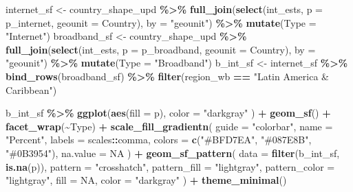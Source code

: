 \documentclass[
]{krantz}
\makeatletter
\newenvironment{Shaded}{\begin{snugshade}}{\end{snugshade}}
\newcommand{\AttributeTok}[1]{\textcolor[rgb]{0.27,0.27,0.27}{#1}}
\newcommand{\ConstantTok}[1]{\textcolor[rgb]{0.37,0.37,0.37}{#1}}
\newcommand{\FunctionTok}[1]{\textcolor[rgb]{0.27,0.27,0.27}{\textbf{#1}}}
\newcommand{\NormalTok}[1]{#1}
\newcommand{\OtherTok}[1]{\textcolor[rgb]{0.37,0.37,0.37}{#1}}
\newcommand{\SpecialCharTok}[1]{\textcolor[rgb]{0.43,0.43,0.43}{\textbf{#1}}}
\newcommand{\StringTok}[1]{\textcolor[rgb]{0.5,0.5,0.5}{#1}}
\newenvironment{kframe}{%
\medskip{}
\setlength{\fboxsep}{.8em}
 \def\at@end@of@kframe{}%
 \ifinner\ifhmode%
  \def\at@end@of@kframe{\end{minipage}}%
  \begin{minipage}{\columnwidth}%
 \fi\fi%
 \def\FrameCommand##1{\hskip\@totalleftmargin \hskip-\fboxsep
 \colorbox{shadecolor}{##1}\hskip-\fboxsep
     \hskip-\linewidth \hskip-\@totalleftmargin \hskip\columnwidth}%
 \MakeFramed {\advance\hsize-\width
   \@totalleftmargin\z@ \linewidth\hsize
   \@setminipage}}%
 {\par\unskip\endMakeFramed%
 \at@end@of@kframe}
\renewenvironment{Shaded}{\begin{kframe}}{\end{kframe}}
\makeatother
\begin{document}
\begin{Shaded}
\begin{Highlighting}[]
\NormalTok{internet\_sf }\OtherTok{\textless{}{-}}\NormalTok{ country\_shape\_upd }\SpecialCharTok{\%\textgreater{}\%}
  \FunctionTok{full\_join}\NormalTok{(}\FunctionTok{select}\NormalTok{(int\_ests, }\AttributeTok{p =}\NormalTok{ p\_internet, }\AttributeTok{geounit =}\NormalTok{ Country), }\AttributeTok{by =} \StringTok{"geounit"}\NormalTok{) }\SpecialCharTok{\%\textgreater{}\%}
  \FunctionTok{mutate}\NormalTok{(}\AttributeTok{Type =} \StringTok{"Internet"}\NormalTok{)}
\NormalTok{broadband\_sf }\OtherTok{\textless{}{-}}\NormalTok{ country\_shape\_upd }\SpecialCharTok{\%\textgreater{}\%}
  \FunctionTok{full\_join}\NormalTok{(}\FunctionTok{select}\NormalTok{(int\_ests, }\AttributeTok{p =}\NormalTok{ p\_broadband, }\AttributeTok{geounit =}\NormalTok{ Country), }\AttributeTok{by =} \StringTok{"geounit"}\NormalTok{) }\SpecialCharTok{\%\textgreater{}\%}
  \FunctionTok{mutate}\NormalTok{(}\AttributeTok{Type =} \StringTok{"Broadband"}\NormalTok{)}
\NormalTok{b\_int\_sf }\OtherTok{\textless{}{-}}\NormalTok{ internet\_sf }\SpecialCharTok{\%\textgreater{}\%}
  \FunctionTok{bind\_rows}\NormalTok{(broadband\_sf) }\SpecialCharTok{\%\textgreater{}\%}
  \FunctionTok{filter}\NormalTok{(region\_wb }\SpecialCharTok{==} \StringTok{"Latin America \& Caribbean"}\NormalTok{)}

\NormalTok{b\_int\_sf }\SpecialCharTok{\%\textgreater{}\%}
  \FunctionTok{ggplot}\NormalTok{(}\FunctionTok{aes}\NormalTok{(}\AttributeTok{fill =}\NormalTok{ p),}
    \AttributeTok{color =} \StringTok{"darkgray"}
\NormalTok{  ) }\SpecialCharTok{+}
  \FunctionTok{geom\_sf}\NormalTok{() }\SpecialCharTok{+}
  \FunctionTok{facet\_wrap}\NormalTok{(}\SpecialCharTok{\textasciitilde{}}\NormalTok{Type) }\SpecialCharTok{+}
  \FunctionTok{scale\_fill\_gradientn}\NormalTok{(}
    \AttributeTok{guide =} \StringTok{"colorbar"}\NormalTok{,}
    \AttributeTok{name =} \StringTok{"Percent"}\NormalTok{,}
    \AttributeTok{labels =}\NormalTok{ scales}\SpecialCharTok{::}\NormalTok{comma,}
    \AttributeTok{colors =} \FunctionTok{c}\NormalTok{(}\StringTok{"\#BFD7EA"}\NormalTok{, }\StringTok{"\#087E8B"}\NormalTok{, }\StringTok{"\#0B3954"}\NormalTok{),}
    \AttributeTok{na.value =} \ConstantTok{NA}
\NormalTok{  ) }\SpecialCharTok{+}
  \FunctionTok{geom\_sf\_pattern}\NormalTok{(}
    \AttributeTok{data =} \FunctionTok{filter}\NormalTok{(b\_int\_sf, }\FunctionTok{is.na}\NormalTok{(p)),}
    \AttributeTok{pattern =} \StringTok{"crosshatch"}\NormalTok{,}
    \AttributeTok{pattern\_fill =} \StringTok{"lightgray"}\NormalTok{,}
    \AttributeTok{pattern\_color =} \StringTok{"lightgray"}\NormalTok{,}
    \AttributeTok{fill =} \ConstantTok{NA}\NormalTok{,}
    \AttributeTok{color =} \StringTok{"darkgray"}
\NormalTok{  ) }\SpecialCharTok{+}
  \FunctionTok{theme\_minimal}\NormalTok{()}
\end{Highlighting}
\end{Shaded}
\end{document}
